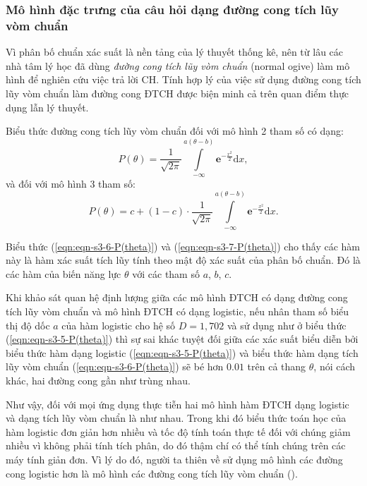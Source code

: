 \subsubsection{Mô hình đặc trưng của câu hỏi dạng đường cong tích lũy vòm chuẩn}
Vì phân bố chuẩn xác suất là nền tảng của lý thuyết thống kê, nên từ lâu các nhà tâm lý học đã dùng \textit{đường cong tích lũy vòm chuẩn} (normal ogive) làm mô hình để nghiên cứu việc trả lời CH. Tính hợp lý của việc sử dụng đường cong tích lũy vòm chuẩn làm đường cong ĐTCH được biện minh cả trên quan điểm thực dụng lẫn lý thuyết.\par
Biểu thức đường cong tích lũy vòm chuẩn đối với mô hình 2 tham số có dạng:
\begin{equation}\label{eqn:eqn-s3-6-P(theta)}
	P(\theta)=\frac{1}{\sqrt{2\pi}}\int\limits_{-\infty}^{a(\theta-b)}\mathbf{e}^{-\frac{x^2}{2}}\mathrm{d}x,
\end{equation}
và đối với mô hình 3 tham số:
\begin{equation}\label{eqn:eqn-s3-7-P(theta)}
	P(\theta)=c+(1-c)\cdot\frac{1}{\sqrt{2\pi}}\int\limits_{-\infty}^{a(\theta-b)}\mathbf{e}^{-\frac{x^2}{2}}\mathrm{d}x.
\end{equation}\par
Biểu thức (\ref{eqn:eqn-s3-6-P(theta)}) và (\ref{eqn:eqn-s3-7-P(theta)}) cho thấy các hàm này là hàm xác suất tích lũy tính theo mật độ xác suất của phân bố chuẩn. Đó là các hàm của biến năng lực $\theta$ với các tham số $a$, $b$, $c$.\par
Khi khảo sát quan hệ định lượng giữa các mô hình ĐTCH có dạng đường cong tích lũy vòm chuẩn và mô hình ĐTCH có dạng logistic, nếu nhân tham số biểu thị độ dốc $a$ của hàm logistic cho hệ số $D=1,702$ và sử dụng như ở biểu thức (\ref{eqn:eqn-s3-5-P(theta)}) thì sự sai khác tuyệt đối giữa các xác suất biểu diễn bởi biểu thức hàm dạng logistic (\ref{eqn:eqn-s3-5-P(theta)}) và biểu thức hàm dạng tích lũy vòm chuẩn (\ref{eqn:eqn-s3-6-P(theta)}) sẽ bé hơn $0.01$ trên cả thang $\theta$, nói cách khác, hai đường cong gần như trùng nhau.\par
Như vậy, đối với mọi ứng dụng thực tiễn hai mô hình hàm ĐTCH dạng logistic và dạng tích lũy vòm chuẩn là như nhau. Trong khi đó biểu thức toán học của hàm logistic đơn giản hơn nhiều và tốc độ tính toán thực tế đối với chúng giảm nhiều vì không phải tính tích phân, do đó thậm chí có thể tính chúng trên các máy tính giản đơn. Vì lý do đó, người ta thiên về sử dụng mô hình các đường cong logistic hơn là mô hình các đường cong tích lũy vòm chuẩn (\cite{thiep2011do}).

